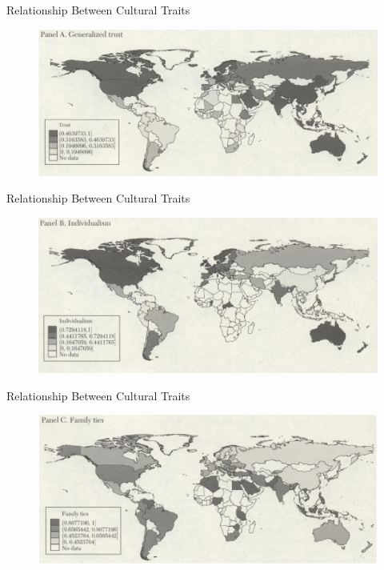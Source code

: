 \documentclass{beamer}
\begin{document}
               \begin{frame}{Relationship Between Cultural Traits}
    
          \begin{figure}
        \centering
        \includegraphics[scale=0.6]{Map1.PNG}

    \end{figure} 

    
    \end{frame}
    
               \begin{frame}{Relationship Between Cultural Traits}
    
          \begin{figure}
        \centering
        \includegraphics[scale=0.6]{Map2.PNG}

    \end{figure} 

    
    \end{frame}

                   \begin{frame}{Relationship Between Cultural Traits}
    
          \begin{figure}
        \centering
        \includegraphics[scale=0.6]{Map3.PNG}

    \end{figure} 

    
    \end{frame}
\end{document}
